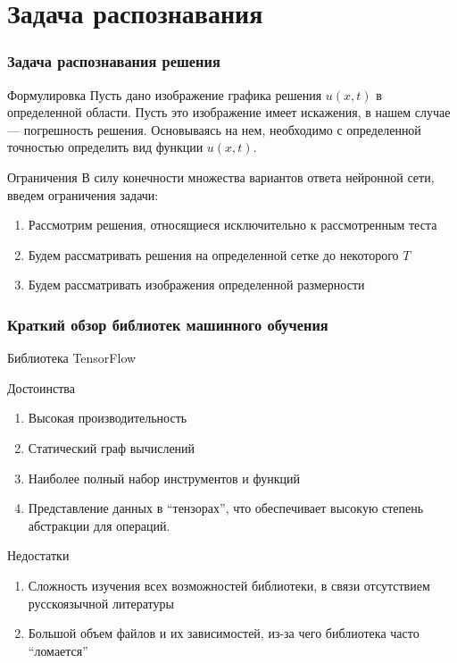 \documentclass{beamer}
\begin{document}
\section{Задача распознавания}
\begin{frame}
	\frametitle{Задача распознавания решения}	
	\begin{block}{Формулировка}
		Пусть дано изображение графика решения $u(x, t)$ в определенной области. Пусть это изображение имеет искажения, в нашем случае --- погрешность решения. Основываясь на нем, необходимо с определенной точностью определить вид функции $u(x, t)$.
	\end{block}	
	
	\begin{block}{Ограничения}
		В силу конечности множества вариантов ответа нейронной сети, введем ограничения задачи:
		\begin{enumerate}
			\item Рассмотрим решения, относящиеся исключительно к рассмотренным теста
			\item Будем рассматривать решения на определенной сетке до некоторого $T$
			\item Будем рассматривать изображения определенной размерности
		\end{enumerate}	
	\end{block}	
\end{frame}


\begin{frame}
	\frametitle{Краткий обзор библиотек машинного обучения}
	Библиотека TensorFlow
	\begin{block}{Достоинства}
		\begin{enumerate}
			\item Высокая производительность
			\item Статический граф вычислений
			\item Наиболее полный набор инструментов и функций
			\item Представление данных в \enquote{тензорах}, что обеспечивает высокую степень абстракции для операций.
			
			
			
			
			
			
		\end{enumerate}
	\end{block}
	
	\begin{block}{Недостатки}
		\begin{enumerate}
			\item Сложность изучения всех возможностей библиотеки, в связи отсутствием русскоязычной литературы
			\item Большой объем файлов и их зависимостей, из-за чего библиотека часто \enquote{ломается}
			
		\end{enumerate}
	\end{block}	
\end{frame}
\end{document}
